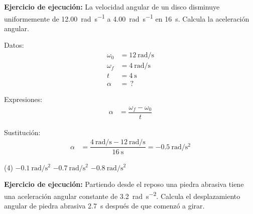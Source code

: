 \documentclass[12pt, letter]{exam}
\begin{document}
\begin{questions}
    \question \textbf{Ejercicio de ejecución: } La velocidad angular de un disco disminuye uniformemente de \SI{12.00}{\radian\per\second} a \SI{4.00}{\radian\per\second} en \SI{16}{\second}. Calcula la aceleración angular.    
    
    \begin{minipage}[t]{0.4\linewidth}
    Datos: 
    \begin{align*}
    \omega_{0} &= \SI{12}{\radian\per\second} \\
    \omega_{f} &= \SI{4}{\radian\per\second} \\
    t &= \SI{4}{\second} \\
    \alpha &= \, ?
    \end{align*}
    \end{minipage}
    \hspace{1cm}
    \begin{minipage}[t]{0.4\linewidth}
    Expresiones:
    \begin{align*}
    \alpha &= \dfrac{\omega_{f} - \omega_{0}}{t}
    \end{align*}
    \end{minipage}

    Sustitución:
    \begin{align*}
    \alpha &= \dfrac{ \displaystyle \SI[per-mode=fraction]{4}{\radian\per\second} - \SI[per-mode=fraction]{12}{\radian\per\second} }{\SI{16}{\second}} = - \SI[per-mode=fraction]{0.5}{\radian\per\square\second}
    \end{align*}

    \begin{tasks}(4)
        \task $\displaystyle -\SI[per-mode=fraction]{0.1}{\radian\per\square\second}$
        \task $\displaystyle -\SI[per-mode=fraction]{0.7}{\radian\per\square\second}$
        \task {}
        \task $\displaystyle -\SI[per-mode=fraction]{0.8}{\radian\per\square\second}$
    \end{tasks}
   
    \question \label{Ejercicio_03} \textbf{Ejercicio de ejecución: } Partiendo desde el reposo una piedra abrasiva tiene una aceleración angular constante de \SI{3.2}{\radian\per\square\second}. Calcula el desplazamiento angular de piedra abrasiva \SI{2.7}{\second} después de que comenzó a girar.


\end{questions}
\end{document}
